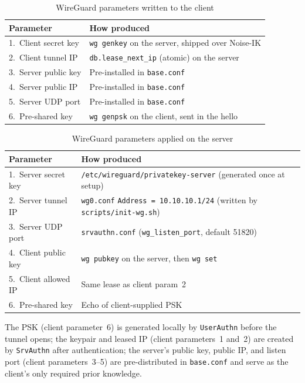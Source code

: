 \begin{table}[H]
\centering
\caption{WireGuard parameters written to the client}
\label{tab:wgparams-client}
\renewcommand{\arraystretch}{1.2}
\scriptsize
\begin{tabular}{p{3.3cm}p{4.2cm}}
\toprule
\textbf{Parameter} & \textbf{How produced} \\
\midrule
1.\ Client secret key        & \texttt{wg genkey} on the server, shipped over Noise-IK \\
2.\ Client tunnel IP         & \texttt{db.lease\_next\_ip} (atomic) on the server \\
3.\ Server public key        & Pre-installed in \texttt{base.conf} \\
4.\ Server public IP         & Pre-installed in \texttt{base.conf} \\
5.\ Server UDP port          & Pre-installed in \texttt{base.conf} \\
6.\ Pre-shared key           & \texttt{wg genpsk} on the client, sent in the hello \\
\bottomrule
\end{tabular}
\end{table}

\begin{table}[H]
\centering
\caption{WireGuard parameters applied on the server}
\label{tab:wgparams-server}
\renewcommand{\arraystretch}{1.2}
\scriptsize
\begin{tabular}{p{3.3cm}p{4.2cm}}
\toprule
\textbf{Parameter} & \textbf{How produced} \\
\midrule
1.\ Server secret key        & \texttt{/etc/wireguard/privatekey-server} (generated once at setup) \\
2.\ Server tunnel IP         & \texttt{wg0.conf} \texttt{Address = 10.10.10.1/24} (written by \texttt{scripts/init-wg.sh}) \\
3.\ Server UDP port          & \texttt{srvauthn.conf} (\texttt{wg\_listen\_port}, default 51820) \\
4.\ Client public key        & \texttt{wg pubkey} on the server, then \texttt{wg set} \\
5.\ Client allowed IP        & Same lease as client param~2 \\
6.\ Pre-shared key           & Echo of client-supplied PSK \\
\bottomrule
\end{tabular}
\end{table}

The PSK (client parameter~6) is generated locally by \texttt{UserAuthn}
before the tunnel opens; the keypair and leased IP (client parameters~1
and~2) are created by \texttt{SrvAuthn} after authentication; the server's
public key, public IP, and listen port (client parameters~3--5) are
pre-distributed in \texttt{base.conf} and serve as the client's only
required prior knowledge.

